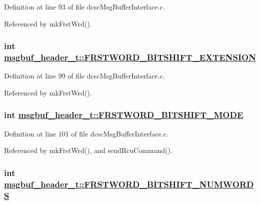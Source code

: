 Definition at line 93 of file dcsc\-Msg\-Buffer\-Interface.c.

Referenced by mk\-Frst\-Wrd().\hypertarget{structmsgbuf__header__t_533600b45879bd3ceca83f1f5441f7fb}{
\subsubsection[FRSTWORD\_\-BITSHIFT\_\-EXTENSION]{\setlength{\rightskip}{0pt plus 5cm}int \hyperlink{structmsgbuf__header__t_533600b45879bd3ceca83f1f5441f7fb}{msgbuf\_\-header\_\-t::FRSTWORD\_\-BITSHIFT\_\-EXTENSION}}}
\label{structmsgbuf__header__t_533600b45879bd3ceca83f1f5441f7fb}




Definition at line 99 of file dcsc\-Msg\-Buffer\-Interface.c.

Referenced by mk\-Frst\-Wrd().\hypertarget{structmsgbuf__header__t_bbad9a4dd78f324a89fe53f5b32b18e8}{
\subsubsection[FRSTWORD\_\-BITSHIFT\_\-MODE]{\setlength{\rightskip}{0pt plus 5cm}int \hyperlink{structmsgbuf__header__t_bbad9a4dd78f324a89fe53f5b32b18e8}{msgbuf\_\-header\_\-t::FRSTWORD\_\-BITSHIFT\_\-MODE}}}
\label{structmsgbuf__header__t_bbad9a4dd78f324a89fe53f5b32b18e8}




Definition at line 101 of file dcsc\-Msg\-Buffer\-Interface.c.

Referenced by mk\-Frst\-Wrd(), and send\-Rcu\-Command().\hypertarget{structmsgbuf__header__t_219d3f943829db1d50613a7f2629818d}{
\subsubsection[FRSTWORD\_\-BITSHIFT\_\-NUMWORDS]{\setlength{\rightskip}{0pt plus 5cm}int \hyperlink{structmsgbuf__header__t_219d3f943829db1d50613a7f2629818d}{msgbuf\_\-header\_\-t::FRSTWORD\_\-BITSHIFT\_\-NUMWORDS}}}
\label{structmsgbuf__header__t_219d3f943829db1d50613a7f2629818d}




